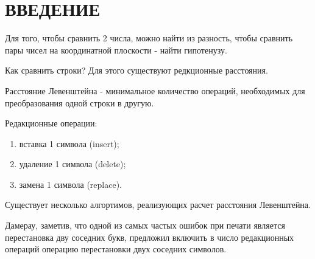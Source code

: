 \section*{ВВЕДЕНИЕ}

Для того, чтобы сравнить 2 числа, можно найти из разность, чтобы сравнить пары чисел на координатной плоскости - найти гипотенузу.\par
Как сравнить строки? Для этого существуют редкционные расстояния.\par
Расстояние Левенштейна - минимальное количество операций, необходимых для преобразования одной строки в другую.\par
Редакционные операции:
\begin{enumerate}[leftmargin=1.6\parindent]
    \item вставка 1 символа (insert);
    \item удаление 1 символа (delete);
    \item замена 1 символа (replace).
\end{enumerate}

Существует несколько алгортимов, реализующих расчет расстояния Левенштейна.\par
Дамерау, заметив, что одной из самых частых ошибок при печати является перестановка дву соседних букв, 
предложил включить в число редакционных операций операцию перестановки двух соседних символов.

\pagebreak
